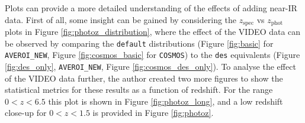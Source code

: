 Plots can provide a more detailed understanding of the effects of adding near-IR data. First of all, some insight can be gained by considering the $z_{\mathrm{spec}}$ vs $z_{\mathrm{phot}}$ plots in Figure \ref{fig:photoz_distribution}, where the effect of the VIDEO data can be observed by comparing the \texttt{default} distributions (Figure \ref{fig:basic} for \texttt{AVEROI\_NEW}, Figure \ref{fig:cosmos_basic} for \texttt{COSMOS}) to the \texttt{des} equivalents (Figure \ref{fig:des_only}, \texttt{AVEROI\_NEW}, Figure \ref{fig:cosmos_des_only}). To analyse the effect of the VIDEO data further, the author created two more figures to show the statistical metrics for these results as a function of redshift. For the range $0<z<6.5$ this plot is shown in Figure \ref{fig:photoz_long}, and a low redshift close-up for $0<z<1.5$ is provided in Figure \ref{fig:photoz}. \par


